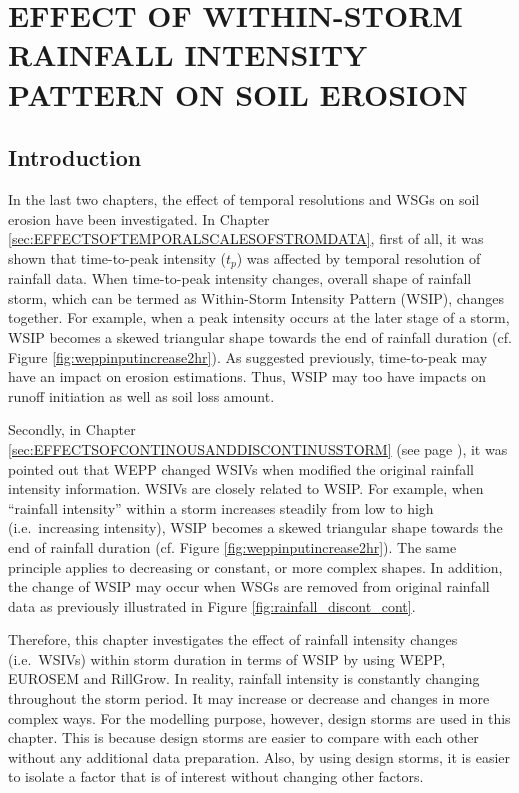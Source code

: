 \chapter{EFFECT OF WITHIN-STORM RAINFALL INTENSITY PATTERN ON SOIL EROSION}
\label{sec:EFFECTSOFRAINFALLINTENSITYCHANGESONSOILEROSION}

\section{Introduction}
\label{sec:IntensiyPatternsIntroduction}

In the last two chapters, the effect of temporal resolutions and WSGs on
soil erosion have been investigated.
In Chapter \ref{sec:EFFECTSOFTEMPORALSCALESOFSTROMDATA}, first of all, it was
shown that time-to-peak intensity ($t_p$) was affected by temporal resolution
of rainfall data. When time-to-peak intensity changes, overall shape of
rainfall storm, which can be termed as Within-Storm Intensity Pattern (WSIP),
changes together. For example, when a peak intensity occurs at the later stage
of a storm, WSIP becomes a skewed triangular shape towards the end of rainfall
duration (cf. Figure \ref{fig:weppinputincrease2hr}). As suggested previously,
time-to-peak may have an impact on erosion estimations. Thus, WSIP may too
have impacts on runoff initiation as well as soil loss amount.

Secondly, in Chapter \ref{sec:EFFECTSOFCONTINOUSANDDISCONTINUSSTORM} (see page
\pageref{sec:WEPPModificationofBP}), it was
pointed out that WEPP changed WSIVs when modified the original rainfall
intensity information. WSIVs are closely related to WSIP. For example, when
``rainfall intensity'' within a storm increases steadily from low to high (i.e.\
increasing intensity), WSIP becomes a skewed triangular shape towards the end of
rainfall duration (cf. Figure \ref{fig:weppinputincrease2hr}). The same
principle applies to decreasing or constant, or more complex shapes. In
addition, the change of WSIP may occur when WSGs are removed from
original rainfall data as previously illustrated in Figure
\ref{fig:rainfall_discont_cont}.

Therefore, this chapter investigates the effect of rainfall intensity changes
(i.e.\ WSIVs) within storm duration in terms of WSIP by using WEPP, EUROSEM and
RillGrow.
In reality, rainfall intensity is constantly changing throughout the storm
period. It may increase or decrease and changes in more complex ways. For the
modelling purpose, however, design storms are used in this chapter. This is
because design storms are easier to compare with each other without any
additional
data preparation. Also, by using design storms, it is easier to isolate
a factor that is of interest without changing other factors.


